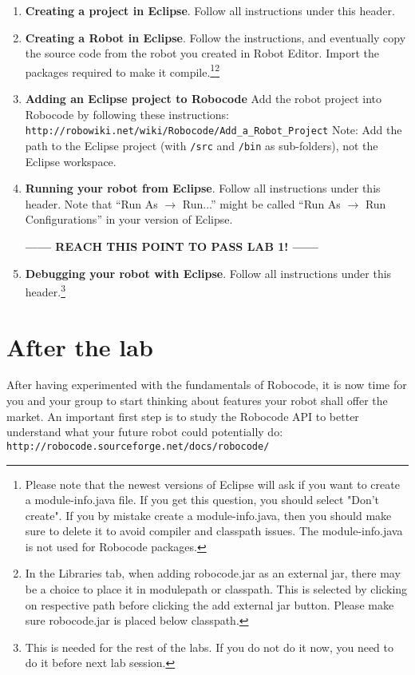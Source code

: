\documentclass{scrreprt}
\begin{document}
\begin{enumerate}
\item \textbf{Creating a project in Eclipse}. Follow all instructions under this header.
\item \textbf{Creating a Robot in Eclipse}. Follow the instructions, and eventually copy the source code from the robot you created in Robot Editor. Import the packages required to make it compile.\footnote{Please note that the newest versions of Eclipse will ask if you want to create a module-info.java file. If you get this question, you should select "Don't create". 
If you by mistake create a module-info.java, then you should make sure to delete it to avoid compiler and classpath issues. The module-info.java is not used for Robocode packages.}\footnote{In the Libraries tab, when adding robocode.jar as an external jar, there may be a choice to place it in modulepath or classpath. This is selected by clicking on respective path before clicking the add external jar button. Please make sure robocode.jar is placed below classpath.}
\item \textbf{Adding an Eclipse project to Robocode} Add the robot project into Robocode by following these instructions:\\\texttt{http://robowiki.net/wiki/Robocode/Add\_a\_Robot\_Project} Note: Add the path to the Eclipse project (with \texttt{/src} and \texttt{/bin} as sub-folders), not the Eclipse workspace.
\item \textbf{Running your robot from Eclipse}. Follow all instructions under this header. Note that ``Run As $\rightarrow$ Run...'' might be called ``Run As $\rightarrow$ Run Configurations'' in your version of Eclipse.

\begin{center}
\textbf{------ REACH THIS POINT TO PASS LAB 1! ------}
\end{center}

\item \textbf{Debugging your robot with Eclipse}. Follow all instructions under this header.\footnote{This is needed for the rest of the labs. If you do not do it now, you need to do it before next lab session.}
\end{enumerate}

\chapter{After the lab}
After having experimented with the fundamentals of Robocode, it is now time for you and your group to start thinking about features your robot shall offer the market. An important first step is to study the Robocode API to better understand what your future robot could potentially do: \texttt{http://robocode.sourceforge.net/docs/robocode/}
\end{document}
